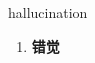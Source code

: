 
\begin{frame}
{\huge hallucination}
\begin{center}
\begin{enumerate}\Large
  \item \textbf{错觉}
\end{enumerate}
\end{center}
\end{frame}
